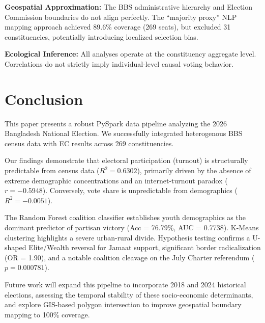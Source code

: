 \documentclass[conference]{IEEEtran}
\begin{document}
\textbf{Geospatial Approximation:} The BBS administrative hierarchy and Election Commission boundaries do not align perfectly. The ``majority proxy'' NLP mapping approach achieved 89.6\% coverage (269 seats), but excluded 31 constituencies, potentially introducing localized selection bias.

\textbf{Ecological Inference:} All analyses operate at the constituency aggregate level. Correlations do not strictly imply individual-level causal voting behavior.

\section{Conclusion}

This paper presents a robust PySpark data pipeline analyzing the 2026 Bangladesh National Election. We successfully integrated heterogenous BBS census data with EC results across 269 constituencies. 

Our findings demonstrate that electoral participation (turnout) is structurally predictable from census data ($R^2 = 0.6302$), primarily driven by the absence of extreme demographic concentrations and an internet-turnout paradox ($r = -0.5948$). Conversely, vote share is unpredictable from demographics ($R^2 = -0.0051$). 

The Random Forest coalition classifier establishes youth demographics as the dominant predictor of partisan victory (Acc = 76.79\%, AUC = 0.7738). K-Means clustering highlights a severe urban-rural divide. Hypothesis testing confirms a U-shaped Elite/Wealth reversal for Jamaat support, significant border radicalization (OR = 1.90), and a notable coalition cleavage on the July Charter referendum ($p = 0.000781$).

Future work will expand this pipeline to incorporate 2018 and 2024 historical elections, assessing the temporal stability of these socio-economic determinants, and explore GIS-based polygon intersection to improve geospatial boundary mapping to 100\% coverage.
\end{document}
